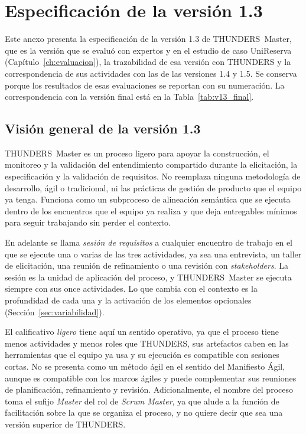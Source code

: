 \documentclass[12pt,letterpaper,oneside]{report}
\begin{document}
\chapter{Especificación de la versión 1.3}
\label{anx:v13}
Este anexo presenta la especificación de la versión 1.3 de THUNDERS~Master, que
es la versión que se evaluó con expertos y en el estudio de caso UniReserva
(Capítulo~\ref{ch:evaluacion}), la trazabilidad de esa versión con THUNDERS y la
correspondencia de sus actividades con las de las versiones 1.4 y 1.5. Se
conserva porque los resultados de esas evaluaciones se reportan con su
numeración. La correspondencia con la versión final está en la
Tabla~\ref{tab:v13_final}.

\section{Visión general de la versión 1.3}
\label{sec:vista-v13}
THUNDERS~Master es un proceso ligero para apoyar la construcción, el monitoreo
y la validación del entendimiento compartido durante la elicitación, la
especificación y la validación de requisitos. No reemplaza ninguna metodología
de desarrollo, ágil o tradicional, ni las prácticas de gestión de producto que
el equipo ya tenga. Funciona como un subproceso de alineación semántica que se
ejecuta dentro de los encuentros que el equipo ya realiza y que deja
entregables mínimos para seguir trabajando sin perder el contexto.

En adelante se llama \emph{sesión de requisitos} a cualquier encuentro de
trabajo en el que se ejecute una o varias de las tres actividades, ya sea una
entrevista, un taller de elicitación, una reunión de refinamiento o una
revisión con \textit{stakeholders}. La sesión es la unidad de aplicación del
proceso, y THUNDERS~Master se ejecuta siempre con sus once actividades. Lo que
cambia con el contexto es la profundidad de cada una y la activación de los
elementos opcionales (Sección~\ref{sec:variabilidad}).

El calificativo \emph{ligero} tiene aquí un sentido operativo, ya que el proceso
tiene menos actividades y menos roles que THUNDERS, sus artefactos caben en las
herramientas que el equipo ya usa y su ejecución es compatible con sesiones
cortas. No se presenta como un método ágil en el sentido del Manifiesto Ágil,
aunque es compatible con los marcos ágiles y puede complementar sus reuniones
de planificación, refinamiento y revisión. Adicionalmente, el nombre del
proceso toma el sufijo \emph{Master} del rol de \textit{Scrum Master}, ya que
alude a la función de facilitación sobre la que se organiza el proceso, y no
quiere decir que sea una versión superior de THUNDERS.
\end{document}
